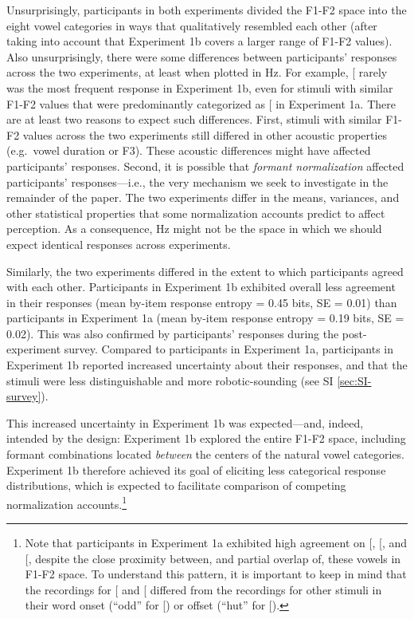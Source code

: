 \documentclass[preprint]{JASA}
\begin{document}
Unsurprisingly, participants in both experiments divided the F1-F2 space into the eight vowel categories in ways that qualitatively resembled each other (after taking into account that Experiment 1b covers a larger range of F1-F2 values). Also unsurprisingly, there were some differences between participants' responses across the two experiments, at least when plotted in Hz. For example, {[}\ipatext{u}{]} rarely was the most frequent response in Experiment 1b, even for stimuli with similar F1-F2 values that were predominantly categorized as {[}\ipatext{u}{]} in Experiment 1a. There are at least two reasons to expect such differences. First, stimuli with similar F1-F2 values across the two experiments still differed in other acoustic properties (e.g.~vowel duration or F3). These acoustic differences might have affected participants' responses. Second, it is possible that \emph{formant normalization} affected participants' responses---i.e., the very mechanism we seek to investigate in the remainder of the paper. The two experiments differ in the means, variances, and other statistical properties that some normalization accounts predict to affect perception. As a consequence, Hz might not be the space in which we should expect identical responses across experiments.

Similarly, the two experiments differed in the extent to which participants agreed with each other. Participants in Experiment 1b exhibited overall less agreement in their responses (mean by-item response entropy = 0.45 bits, SE = 0.01) than participants in Experiment 1a (mean by-item response entropy = 0.19 bits, SE = 0.02). This was also confirmed by participants' responses during the post-experiment survey. Compared to participants in Experiment 1a, participants in Experiment 1b reported increased uncertainty about their responses, and that the stimuli were less distinguishable and more robotic-sounding (see SI \ref{sec:SI-survey}).

This increased uncertainty in Experiment 1b was expected---and, indeed, intended by the design: Experiment 1b explored the entire F1-F2 space, including formant combinations located \emph{between} the centers of the natural vowel categories. Experiment 1b therefore achieved its goal of eliciting less categorical response distributions, which is expected to facilitate comparison of competing normalization accounts.\footnote{Note that participants in Experiment 1a exhibited high agreement on {[}\ipatext{ʌ}{]}, {[}\ipatext{æ}{]}, and {[}\ipatext{ɑ}{]}, despite the close proximity between, and partial overlap of, these vowels in F1-F2 space. To understand this pattern, it is important to keep in mind that the recordings for {[}\ipatext{ʌ}{]} and {[}\ipatext{ɑ}{]} differed from the recordings for other stimuli in their word onset (``odd'' for {[}\ipatext{ɑ}{]}) or offset (``hut'' for {[}\ipatext{ʌ}{]}).}
\end{document}
